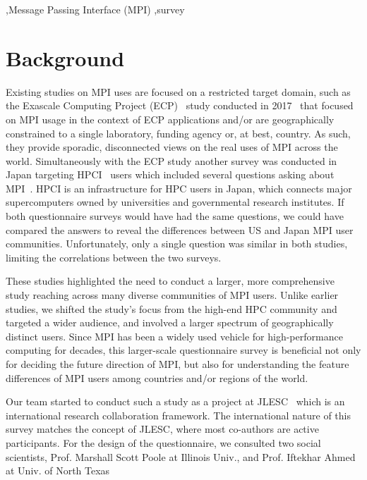 \documentclass[preprint,5p,times]{elsarticle}
\begin{document}
\begin{keyword}
   \sep Message Passing Interface (MPI) \sep survey
\end{keyword}

\maketitle

\section{Background}\label{sec:background}

Existing studies on MPI uses are focused on a restricted target
domain, such as the Exascale Computing Project (ECP)~\cite{ECP} study
conducted in 2017~\cite{ECP-survey} that focused
on MPI usage in the
context of ECP applications and/or are geographically
constrained to a single laboratory, funding agency or, at best,
country. As such, they provide sporadic, disconnected views on the real
uses of MPI across the world.
%
Simultaneously with
the ECP study another survey was conducted in Japan targeting
HPCI~\cite{HPCI} users which included several questions asking about
MPI~\cite{hpci-user-survey}.  HPCI is an infrastructure for HPC users
in Japan, which connects major supercomputers owned by universities and
governmental research institutes. If both questionnaire surveys would
have had the same questions, we could have compared the answers to reveal
the differences between US and Japan MPI user
communities. Unfortunately, only a single question was similar in both
studies, limiting the correlations between the two surveys.

These studies highlighted the need to conduct a larger, more comprehensive
study reaching across many diverse communities of MPI users.
Unlike earlier studies, we shifted the study's focus from
the high-end HPC community and targeted a wider audience, and involved a larger
spectrum of geographically distinct users. Since MPI has been a widely used
vehicle for high-performance computing for decades, this larger-scale
questionnaire survey is beneficial not only for deciding the future
direction of MPI, but also for understanding the feature differences of MPI
users among countries and/or regions of the world.

Our team started to conduct such a study as a project at
JLESC~\cite{JLESC} which is an international research collaboration
framework. The international nature of this survey matches the concept
of JLESC, where most co-authors are active participants.
For the design of the questionnaire,
we consulted two social scientists, Prof. Marshall Scott Poole at
Illinois Univ., and Prof. Iftekhar Ahmed at Univ. of North Texas
\end{document}
